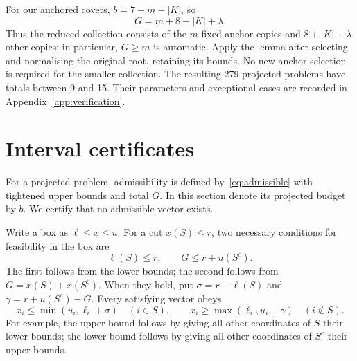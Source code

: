 \documentclass[11pt]{article}
\theoremstyle{remark}
\begin{document}
For our anchored covers, $b=7-m-|K|$, so
\[
 G=m+8+|K|+\lambda.
\]
Thus the reduced collection consists of the $m$ fixed anchor copies and
$8+|K|+\lambda$ other copies; in particular, $G\ge m$ is automatic. Apply the lemma
after selecting and normalising the original root, retaining its bounds.
No new anchor selection is required for the smaller collection.
The resulting 279 projected problems have totals between 9 and 15.
Their parameters and exceptional cases are recorded in
Appendix~\ref{app:verification}.

\section{Interval certificates}\label{sec:certificates}
For a projected problem, admissibility is defined by~\eqref{eq:admissible}
with tightened upper bounds and total $G$. In this section denote its
projected budget by $b$. We certify that no admissible vector exists.

Write a box as $\ell\le x\le u$. For a cut $x(S)\le r$, two necessary
conditions for feasibility in the box are
\begin{equation}\label{eq:possible}
  \ell(S)\le r,\qquad G\le r+u(S^c).
\end{equation}
The first follows from the lower bounds; the second follows from
$G=x(S)+x(S^c)$. When they hold, put
$\sigma=r-\ell(S)$ and $\gamma=r+u(S^c)-G$. Every satisfying vector obeys
\begin{equation}\label{eq:refine}
 x_i\le\min(u_i,\ell_i+\sigma)\quad(i\in S),\qquad
 x_i\ge\max(\ell_i,u_i-\gamma)\quad(i\notin S).
\end{equation}
For example, the upper bound follows by giving all other coordinates of $S$
their lower bounds; the lower bound follows by giving all other coordinates
of $S^c$ their upper bounds.
\end{document}
